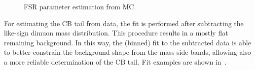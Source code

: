 \begin{figure}[hbtp]
  \begin{center}
  \caption{FSR parameter estimation from MC.}
  \label{fig:fsr_mc_pull}
  \end{center}
\end{figure}

For estimating the CB tail from data, the fit is performed after subtracting the  like-sign dimuon mass distribution. This procedure results in a mostly flat remaining background. In this way, the (binned) fit to the subtracted data is able to better constrain the background shape from the mass side-bands, allowing also a more reliable determination of the CB tail. Fit examples are shown in~. 


